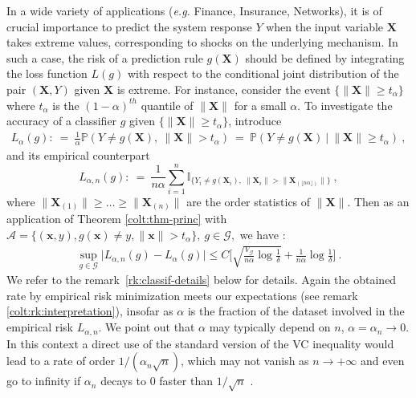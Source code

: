 In a wide variety of applications (\textit{e.g.} Finance, Insurance, Networks), it is of crucial importance to predict the system response $Y$ when the input variable $\mathbf{X}$ takes extreme values, corresponding to shocks on the underlying mechanism. In such a case, the risk of a prediction rule $g(\mathbf{X})$ should be defined by integrating the loss function $L(g)$ with respect to the conditional joint distribution of the pair $(\mathbf{X},Y)$ given $\mathbf{X}$ is extreme. For instance, consider the event $\{\|\mathbf{X}\| \ge t_\alpha\}$ where $t_\alpha$ is the $(1-\alpha)^{th}$ quantile of $\|\mathbf{X}\|$ for a small $\alpha$. To investigate the accuracy of a classifier $g$ given $\{\|\mathbf{X}\| \ge t_\alpha\}$,
introduce 
\begin{align*}
L_{\alpha}(g):~=~ \frac{1}{\alpha}\mathbb{P}\left(Y\neq g(\mathbf{X}),~ \| \mathbf{X}\|>t_\alpha \right)~=~\mathbb{P}\left(Y \neq g(\mathbf{X}) ~\big|~ \|\mathbf{X}\| \ge t_\alpha \right)~,
\end{align*}
\noindent
 and its empirical
 counterpart \[L_{\alpha,n}(g):~=~\frac{1}{n\alpha}\sum_{i=1}^n\mathds{I}_{\{Y_i\neq
   g(\mathbf{X}_i),~ \| \mathbf{X}_i\| > \|  \mathbf{X}_{(\lfloor n\alpha \rfloor)} \|  \}}~,\]
 where $\| \mathbf{X}_{(1)}\| \geq \ldots \geq \| \mathbf{X}_{(n)}\|$ are the order
 statistics of $\| \mathbf{X}\|$. Then as an application of Theorem \ref{colt:thm-princ} with $\mathcal{A} = \{(\mathbf{x},y), g(\mathbf{x}) \neq y, \|\mathbf{x}\| > t_\alpha\},~g\in\mathcal{G},$ we have : 
\begin{align}
\label{colt:prediction:rates}
\sup_{g\in \mathcal{G}} \bigg| L_{\alpha, n}(g)- L_{\alpha}(g) \bigg|  \le C \bigg[ \sqrt{\frac{V_{\mathcal{G}}}{n\alpha} \log \frac{1}{\delta}} + \frac{1}{n\alpha} \log{\frac{1}{\delta}} \bigg]~.
\end{align}
We refer to the remark~\ref{rk:classif-details} below for details. Again the obtained rate by
empirical risk minimization  meets our expectations (see remark \ref{colt:rk:interpretation}), insofar as $\alpha$ is the fraction %
of the dataset involved in the empirical risk $L_{\alpha, n}$. We point out that $\alpha$ may typically depend on $n$, $\alpha = \alpha_n \to 0$.
In this context a direct use of the 
standard version of the \textsc{VC} inequality would lead to a rate  of order $1/(\alpha_n\sqrt{n})$, which may not vanish as $n\rightarrow +\infty$ and even go to infinity if $\alpha_n$ decays to $0$ faster than $1/\sqrt{n}$ . 

